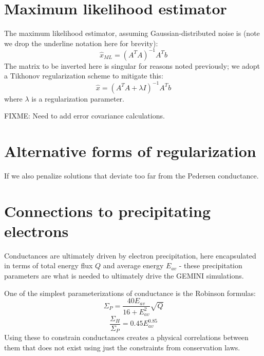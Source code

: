 \documentclass[11pt,letterpaper]{article}
\begin{document}
\section{Maximum likelihood estimator}

The maximum likelihood estimator, assuming Gaussian-distributed noise is (note we drop the underline notation here for brevity):
\begin{equation}
\hat{x}_{ML} = \left( A^T A  \right)^{-1} A^T b
\end{equation}
The matrix to be inverted here is singular for reasons noted previously; we adopt a Tikhonov regularization scheme to mitigate this:
\begin{equation}
\hat{x} = \left( A^T A  + \lambda I \right)^{-1} A^T b
\end{equation}
where $\lambda$ is a regularization parameter.  

FIXME: Need to add error covariance calculations.  


\section{Alternative forms of regularization}

If we also penalize solutions that deviate too far from the Pedersen conductance.  


\section{Connections to precipitating electrons}

Conductances are ultimately driven by electron precipitation, here encapsulated in terms of total energy flux $Q$ and average energy $E_{av}$ - these precipitation parameters are what is needed to ultimately drive the GEMINI simulations.  

One of the simplest parameterizations of conductance is the Robinson formulas:
\begin{equation}
\Sigma_P = \frac{40 E_{av}}{16+E_{av}^2} \sqrt{Q}
\end{equation}
\begin{equation}
\frac{\Sigma_H}{\Sigma_P} = 0.45 E_{av}^{0.85}
\end{equation}
Using these to constrain conductances creates a physical correlations between them that does not exist using just the constraints from conservation laws.  
\end{document}
